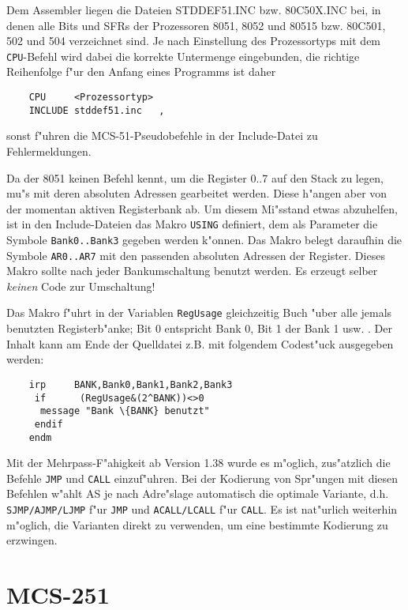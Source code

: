 \documentclass[12pt,a4paper,twoside]{report}
\newcommand{\ii}[1]{{\it #1}}
\newcommand{\tty}[1]{{\tt #1}}
\begin{document}
Dem Assembler liegen die Dateien STDDEF51.INC bzw. 80C50X.INC bei, in
denen alle Bits und SFRs der Prozessoren 8051, 8052 und 80515 bzw. 80C501,
502 und 504 verzeichnet sind.  Je nach Einstellung des Prozessortyps mit
dem \tty{CPU}-Befehl wird dabei die korrekte Untermenge eingebunden, die
richtige Reihenfolge f"ur den Anfang eines Programms ist daher
\begin{verbatim}
	CPU     <Prozessortyp>
	INCLUDE stddef51.inc   ,
\end{verbatim}
sonst f"uhren die MCS-51-Pseudobefehle in der Include-Datei zu
Fehlermeldungen.
\par
Da der 8051 keinen Befehl kennt, um die Register 0..7 auf den Stack zu
legen, mu"s mit deren absoluten Adressen gearbeitet werden.  Diese
h"angen aber von der momentan aktiven Registerbank ab.  Um diesem Mi"sstand
etwas abzuhelfen, ist in den Include-Dateien das Makro \tty{USING} definiert,
dem als Parameter die Symbole \tty{Bank0..Bank3} gegeben werden k"onnen.
Das Makro belegt daraufhin die Symbole \tty{AR0..AR7} mit den passenden
absoluten Adressen der Register.  Dieses Makro sollte nach jeder
Bankumschaltung benutzt werden.  Es erzeugt selber \ii{keinen} Code zur
Umschaltung!
\par
Das Makro f"uhrt in der Variablen \tty{RegUsage} gleichzeitig Buch "uber
alle jemals benutzten Registerb"anke; Bit 0 entspricht Bank 0, Bit 1 der
Bank 1 usw. .  Der Inhalt kann am Ende der Quelldatei z.B. mit folgendem
Codest"uck ausgegeben werden:
\begin{verbatim}
	irp     BANK,Bank0,Bank1,Bank2,Bank3
	 if      (RegUsage&(2^BANK))<>0
	  message "Bank \{BANK} benutzt"
	 endif
	endm
\end{verbatim}
Mit der Mehrpass-F"ahigkeit ab Version 1.38 wurde es m"oglich, zus"atzlich
die Befehle \tty{JMP} und \tty{CALL} einzuf"uhren.  Bei der Kodierung
von Spr"ungen mit diesen Befehlen w"ahlt AS je nach Adre"slage automatisch
die optimale Variante, d.h. \tty{SJMP/AJMP/LJMP} f"ur \tty{JMP} und
\tty{ACALL/LCALL} f"ur \tty{CALL}.  Es ist nat"urlich weiterhin m"oglich,
die Varianten direkt zu verwenden, um eine bestimmte Kodierung zu erzwingen.


\section{MCS-251}
\end{document}

